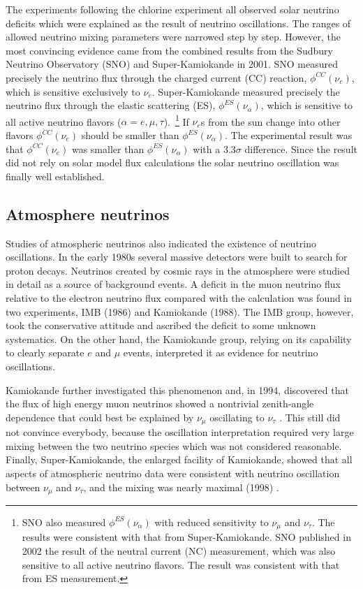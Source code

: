 The experiments \cite{Hir89, Aba91, Ans92} following the chlorine experiment all observed solar neutrino deficits which were explained as the result of neutrino oscillations. The ranges of allowed neutrino mixing parameters were narrowed step by step. However, the most convincing evidence came from the combined results from the Sudbury Neutrino Observatory (SNO) \cite{Ahm01} and Super-Kamiokande \cite{Fuk01} in 2001. SNO measured precisely the neutrino flux through the charged current (CC) reaction, $\phi^{CC}(\nu_e)$, which is sensitive exclusively to $\nu_e$. Super-Kamiokande measured precisely the neutrino flux through the elastic scattering (ES), $\phi^{ES}(\nu_\alpha)$, which is sensitive to all active neutrino flavors ($\alpha = e, \mu, \tau$).~\footnote{SNO also measured $\phi^{ES}(\nu_\alpha)$ with reduced sensitivity to $\nu_{\mu}$ and $\nu_{\tau}$. The results were consistent with that from Super-Kamiokande. SNO published in 2002 the result of the neutral current (NC) measurement, which was also sensitive to all active neutrino flavors. The result was consistent with that from ES measurement.} If $\nu_e$s from the sun change into other flavors $\phi^{CC}(\nu_e)$ should be smaller than $\phi^{ES}(\nu_\alpha)$. The experimental result was that $\phi^{CC}(\nu_e)$ was smaller than $\phi^{ES}(\nu_\alpha)$ with a $3.3\sigma$ difference. Since the result did not rely on solar model flux calculations the solar neutrino oscillation was finally well established.


\subsection{Atmosphere neutrinos}
\label{sec:atmo}
Studies of atmospheric neutrinos also indicated the existence of neutrino oscillations. In the early 1980s several massive detectors were built to search for proton decays. Neutrinos created by cosmic rays in the atmosphere were studied in detail as a source of background events. A deficit in the muon neutrino flux relative to the electron neutrino flux compared with the calculation was found in two experiments, IMB \cite{Hai86} (1986) and Kamiokande \cite{Hir88} (1988). The IMB group, however, took the conservative attitude and ascribed the deficit to some unknown systematics. On the other hand, the Kamiokande group, relying on its capability to clearly separate $e$ and $\mu$ events, interpreted it as evidence for neutrino oscillations.

Kamiokande further investigated this phenomenon and, in 1994, discovered that the flux of high energy muon neutrinos showed a nontrivial zenith-angle dependence that could best be explained by $\nu_\mu$ oscillating to $\nu_\tau$ \cite{Fuk94}. This still did not convince everybody, because the oscillation interpretation required very large mixing between the two neutrino species which was not considered reasonable. Finally, Super-Kamiokande, the enlarged facility of Kamiokande, showed that all aspects of atmospheric neutrino data were consistent with neutrino oscillation between $\nu_\mu$ and $\nu_\tau$, and the mixing was nearly maximal (1998) \cite{Fuk98}.

